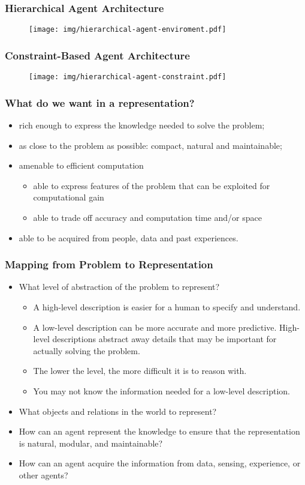 \documentclass[UTF8,11pt,colorlinks,compress,openany]{beamer}%
\begin{document}
\begin{frame}\frametitle{Hierarchical Agent Architecture}
\begin{figure}[H]
\texttt{[image: img/hierarchical-agent-enviroment.pdf]}	
\end{figure}
\end{frame}

\begin{frame}\frametitle{Constraint-Based Agent Architecture}
\begin{figure}[H]
\texttt{[image: img/hierarchical-agent-constraint.pdf]}	
\end{figure}
\end{frame}

\begin{frame}\frametitle{What do we want in a representation?}
\begin{itemize}
	\item rich enough to express the knowledge needed to solve the problem;
	\item as close to the problem as possible: compact, natural and maintainable;
	\item amenable to efficient computation
	\begin{itemize}
		\item able to express features of the problem that can be exploited for computational gain
		\item able to trade off accuracy and computation time and/or space
	\end{itemize}
	\item able to be acquired from people, data and past experiences.
\end{itemize}
\end{frame}

\begin{frame}\frametitle{Mapping from Problem to Representation}
\begin{itemize}
	\item What level of abstraction of the problem to represent?
	\begin{itemize}
		\item A high-level description is easier for a human to specify and understand.
		\item A low-level description can be more accurate and more predictive. High-level descriptions abstract away details that may be important for actually solving the problem.
		\item The lower the level, the more difficult it is to reason with.
		\item You may not know the information needed for a low-level description.
	\end{itemize}
	\item What objects and relations in the world to represent?
	\item How can an agent represent the knowledge to ensure that the representation is natural, modular, and maintainable?
	\item How can an agent acquire the information from data, sensing, experience, or other agents?
\end{itemize}
\end{frame}
\end{document}
